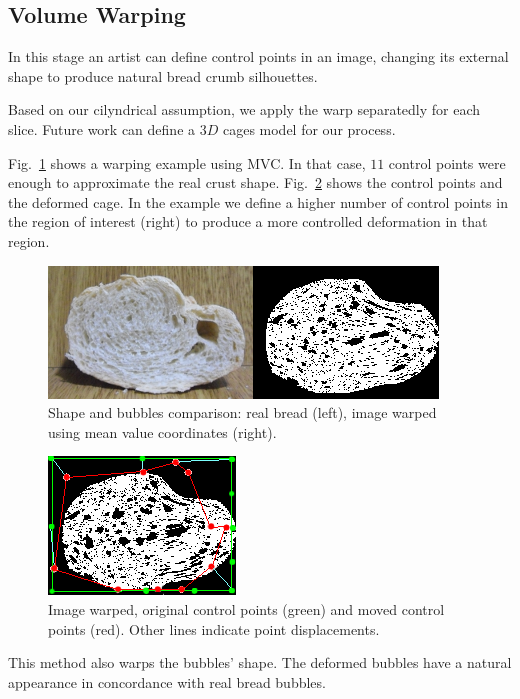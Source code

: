 \documentclass[final,5p,times]{elsarticle}
\begin{document}
{%
\subsection{Volume Warping}
In this stage an artist can define control points in an image, changing its external shape to produce natural bread crumb silhouettes. 


Based on our cilyndrical assumption, we apply the warp separatedly for each slice. Future work can define a $3D$ cages model for our process.


Fig.~\ref{FigMVC} shows a warping example using MVC. In that case, $11$ control points were enough to approximate the real crust shape. Fig.~\ref{FigMVCpoints} shows the control points and the deformed cage. In the example we define a higher number of control points in the region of interest (right) to produce a more controlled deformation in that region.

\begin{figure}[!ht]
\includegraphics[scale=0.65]{warping.png}
\caption{Shape and bubbles comparison: real bread (left), image warped using mean value coordinates (right).}
\label{FigMVC}
\end{figure}


\begin{figure}[!ht]
\includegraphics[scale=1.35]{warppoints.png}
\caption{Image warped, original control points (green) and moved control points (red). Other lines indicate point displacements. }
\label{FigMVCpoints}
\end{figure}


This method also warps the bubbles' shape. The deformed bubbles have a natural appearance in concordance with real bread bubbles. 


}
\end{document}
